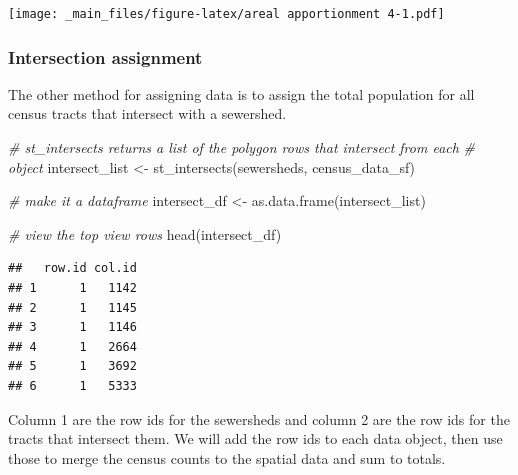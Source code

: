 \documentclass[
]{book}
\newenvironment{Shaded}{\begin{snugshade}}{\end{snugshade}}
\newcommand{\CommentTok}[1]{\textcolor[rgb]{0.56,0.35,0.01}{\textit{#1}}}
\newcommand{\FunctionTok}[1]{\textcolor[rgb]{0.00,0.00,0.00}{#1}}
\newcommand{\NormalTok}[1]{#1}
\newcommand{\OtherTok}[1]{\textcolor[rgb]{0.56,0.35,0.01}{#1}}
\begin{document}
\texttt{[image: \_main\_files/figure-latex/areal apportionment 4-1.pdf]}

\hypertarget{intersection-assignment}{%
\subsubsection{Intersection assignment}\label{intersection-assignment}}

The other method for assigning data is to assign the total population for all census tracts that intersect with a sewershed.

\begin{Shaded}
\begin{Highlighting}[]
\CommentTok{\# st\_intersects returns a list of the polygon rows that intersect from each }
\CommentTok{\# object}
\NormalTok{intersect\_list }\OtherTok{\textless{}{-}} \FunctionTok{st\_intersects}\NormalTok{(sewersheds, census\_data\_sf)}
\end{Highlighting}
\end{Shaded}

\begin{Shaded}
\begin{Highlighting}[]
\CommentTok{\# make it a dataframe}
\NormalTok{intersect\_df }\OtherTok{\textless{}{-}} \FunctionTok{as.data.frame}\NormalTok{(intersect\_list)}

\CommentTok{\# view the top view rows}
\FunctionTok{head}\NormalTok{(intersect\_df)}
\end{Highlighting}
\end{Shaded}

\begin{verbatim}
##   row.id col.id
## 1      1   1142
## 2      1   1145
## 3      1   1146
## 4      1   2664
## 5      1   3692
## 6      1   5333
\end{verbatim}

Column 1 are the row ids for the sewersheds and column 2 are the row ids for the tracts that intersect them. We will add the row ids to each data object, then use those to merge the census counts to the spatial data and sum to totals.
\end{document}

